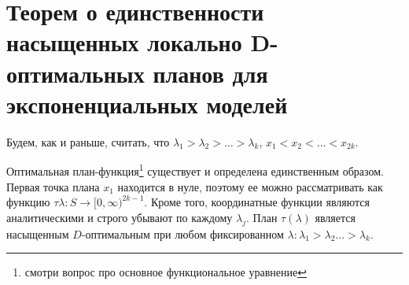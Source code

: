 \section{Теорем о единственности насыщенных локально D-оптимальных планов для экспоненциальных моделей}

Будем, как и раньше, считать, что $\lambda_1 > \lambda_2 > … > \lambda_k$, $x_1 < x_2 < … < x_{2k}$. 

\begin{thm}

Оптимальная план-функция\footnote{смотри вопрос про основное функциональное уравнение} существует и определена единственным образом. Первая точка плана $x_1$ находится в нуле, поэтому ее можно рассматривать как функцию $\tau{\lambda} : S \rightarrow [0, \infty)^{2k-1}$. Кроме того, координатные функции являются аналитическими и строго убывают по каждому $\lambda_j$. План $\tau(\lambda)$ является насыщенным $D$-оптимальным при любом фиксированном $\lambda: \lambda_1 > \lambda_2 … > \lambda_k$.
\end{thm}


